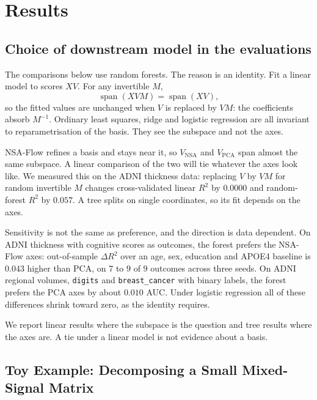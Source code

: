 \documentclass[
]{article}
\begin{document}
\section{Results}\label{results}

\subsection{Choice of downstream model in the evaluations}\label{evaluation}

The comparisons below use random forests. The reason is an identity. Fit a linear
model to scores \(XV\). For any invertible \(M\),
\[
\operatorname{span}(XVM) = \operatorname{span}(XV),
\]
so the fitted values are unchanged when \(V\) is replaced by \(VM\): the
coefficients absorb \(M^{-1}\). Ordinary least squares, ridge and logistic
regression are all invariant to reparametrisation of the basis. They see the
subspace and not the axes.

NSA-Flow refines a basis and stays near it, so \(V_{\text{NSA}}\) and
\(V_{\text{PCA}}\) span almost the same subspace. A linear comparison of the two
will tie whatever the axes look like. We measured this on the ADNI thickness
data: replacing \(V\) by \(VM\) for random invertible \(M\) changes
cross-validated linear \(R^2\) by \(0.0000\) and random-forest \(R^2\) by
\(0.057\). A tree splits on single coordinates, so its fit depends on the axes.

Sensitivity is not the same as preference, and the direction is data dependent.
On ADNI thickness with cognitive scores as outcomes, the forest prefers the
NSA-Flow axes: out-of-sample \(\Delta R^2\) over an age, sex, education and
APOE4 baseline is \(0.043\) higher than PCA, on \(7\) to \(9\) of \(9\)
outcomes across three seeds. On ADNI regional volumes, \texttt{digits} and
\texttt{breast\_cancer} with binary labels, the forest prefers the PCA axes by about
\(0.010\) AUC. Under logistic regression all of these differences shrink toward
zero, as the identity requires.

We report linear results where the subspace is the question and tree results
where the axes are. A tie under a linear model is not evidence about a basis.

\subsection{Toy Example: Decomposing a Small Mixed-Signal Matrix}\label{toy-example-decomposing-a-small-mixed-signal-matrix}
\end{document}
